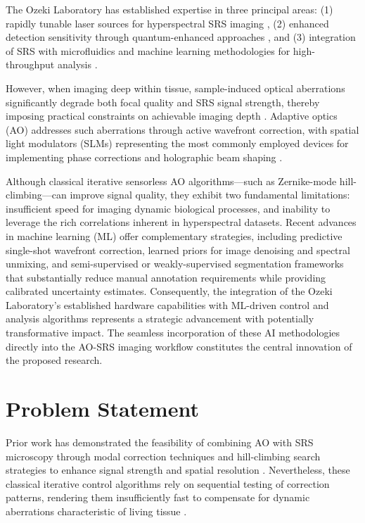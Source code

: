 \documentclass[12pt,a4paper]{article}
\begin{document}
The Ozeki Laboratory has established expertise in three principal areas: (1) rapidly tunable laser sources for hyperspectral SRS imaging \cite{ozeki2019}, (2) enhanced detection sensitivity through quantum-enhanced approaches \cite{ozeki2020b}, and (3) integration of SRS with microfluidics and machine learning methodologies for high-throughput analysis \cite{ozeki2012,ozeki2020a,suzuki2019}.

However, when imaging deep within tissue, sample-induced optical aberrations significantly degrade both focal quality and SRS signal strength, thereby imposing practical constraints on achievable imaging depth \cite{ji2020}. Adaptive optics (AO) addresses such aberrations through active wavefront correction, with spatial light modulators (SLMs) representing the most commonly employed devices for implementing phase corrections and holographic beam shaping \cite{papadopoulos2008}.
 
Although classical iterative sensorless AO algorithms—such as Zernike-mode hill-climbing—can improve signal quality, they exhibit two fundamental limitations: insufficient speed for imaging dynamic biological processes, and inability to leverage the rich correlations inherent in hyperspectral datasets. Recent advances in machine learning (ML) offer complementary strategies, including predictive single-shot wavefront correction, learned priors for image denoising and spectral unmixing, and semi-supervised or weakly-supervised segmentation frameworks that substantially reduce manual annotation requirements while providing calibrated uncertainty estimates. Consequently, the integration of the Ozeki Laboratory's established hardware capabilities with ML-driven control and analysis algorithms represents a strategic advancement with potentially transformative impact. The seamless incorporation of these AI methodologies directly into the AO-SRS imaging workflow constitutes the central innovation of the proposed research.

\section{Problem Statement}
Prior work has demonstrated the feasibility of combining AO with SRS microscopy through modal correction techniques and hill-climbing search strategies to enhance signal strength and spatial resolution \cite{wang2024a}. Nevertheless, these classical iterative control algorithms rely on sequential testing of correction patterns, rendering them insufficiently fast to compensate for dynamic aberrations characteristic of living tissue \cite{booth2006,tao2013}.
\end{document}
